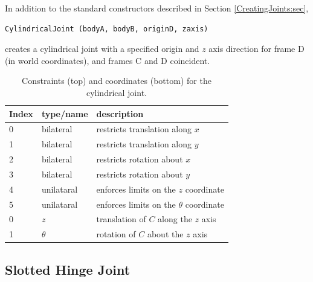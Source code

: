 In addition to the standard constructors described in
Section \ref{CreatingJoints:sec},
%
\begin{lstlisting}[]
  CylindricalJoint (bodyA, bodyB, originD, zaxis)
\end{lstlisting}
%
creates a cylindrical joint with a specified origin and $z$ axis direction
for frame D (in world coordinates), and frames C and D coincident.

\begin{table}[h]
\centering
\begin{tabular}{|l|l|l|}
\hline
Index & type/name & description \\
\hline
0 & bilateral & restricts translation along $x$ \\
1 & bilateral & restricts translation along $y$ \\
2 & bilateral & restricts rotation about $x$ \\
3 & bilateral & restricts rotation about $y$ \\
4 & unilataral & enforces limits on the $z$ coordinate \\
5 & unilataral & enforces limits on the $\theta$ coordinate \\
\hline
\hline
0 & $z$ & translation of $C$ along the $z$ axis \\
1 & $\theta$ & rotation of $C$ about the $z$ axis \\
\hline
\end{tabular}
\caption{Constraints (top) and coordinates (bottom) for the cylindrical joint.}
\label{CylindricalConstraints:tbl}
\end{table}

\subsection{Slotted Hinge Joint}
\label{SlottedHingeJoint:sec}

